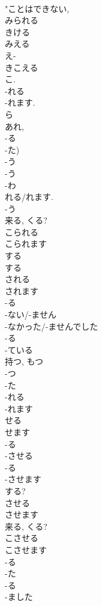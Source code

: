 \documentclass[8pt]{extreport}
\begin{document}
\begin{CJK}{UTF8}{min}
\\	"ことはできない, 
\\	みられる 
\\	きける 
\\	みえる 
\\	え-
\\	きこえる 
\\	こ.
\\	-れる 
\\	-れます. 
\\	ら 
\\	あれ, 
\\	-る 
\\	-た)	
\\	-う 
\\	-う 
\\	-わ 
\\	れる/れます.	
\\	-う 
\\	来る, くる?	
\\	こられる 
\\	こられます 
\\	する 
\\	する 
\\	される 
\\	されます	
\\	-る 
\\	-ない/-ません 
\\	-なかった/-ませんでした 
\\	-る 
\\	-ている	
\\	持つ, もつ 
\\	-つ 
\\	-た 
\\	-れる 
\\	-れます
\\	せる 
\\	せます	
\\	-る 
\\	-させる 
\\	-る 
\\	-させます	
\\	する?	
\\	させる 
\\	させます	
\\	来る, くる?
\\	こさせる 
\\	こさせます	
\\	-る 
\\	-た 
\\	-る 
\\	-ました	

\end{CJK}
\end{document}
